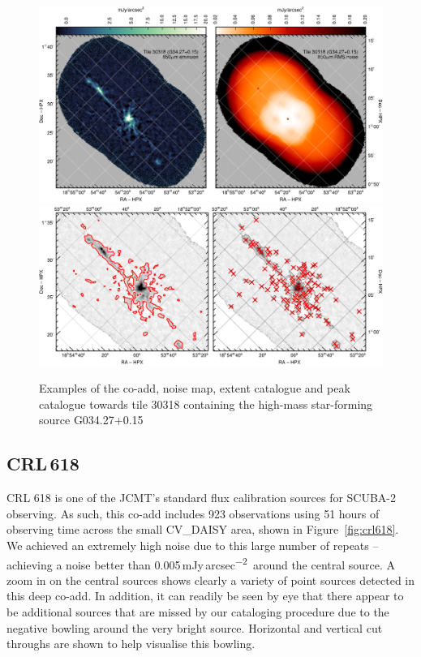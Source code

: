 \documentclass[twocolumn,times]{aastex6}
\newcommand{\jyas}{Jy\,arcsec\textsuperscript{$-$2}}
\begin{document}
\begin{figure}
  \centering
  \includegraphics{tile30318-g34-coadd-noise.pdf}
  \\[3mm]
  \includegraphics{tile30318-g34-extent-peak.pdf}
  \caption{Examples of the co-add, noise map, extent catalogue and peak
    catalogue towards tile 30318 containing the high-mass star-forming
    source G034.27+0.15}
  \label{fig:g34-3}
\end{figure}
\subsection{CRL\,618}
CRL 618 is one of the JCMT's standard flux calibration sources for
SCUBA-2 observing. As such, this co-add includes 923 observations using
51 hours of observing time across the small CV\_DAISY area, shown in
Figure~\ref{fig:crl618}. We achieved an extremely high noise due to
this large number of repeats -- achieving a noise better than
0.005\,m\jyas\ around the central source. A zoom in on the central
sources shows clearly a variety of point sources detected in this deep
co-add. In addition, it can readily be seen by eye that there appear to
be additional sources that are missed by our cataloging procedure due
to the negative bowling around the very bright source. Horizontal and
vertical cut throughs are shown to help visualise this bowling.
\end{document}
